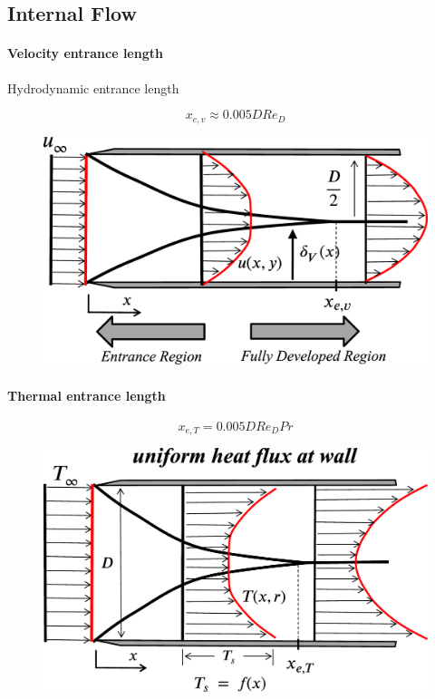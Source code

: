 \documentclass[12pt, a4paper]{article}
\numberwithin{equation}{subsection}
\begin{document}
\subsection{Internal Flow}
\paragraph{Velocity entrance length} Hydrodynamic entrance length

\[
    x_{e,v} \approx 0.005 D Re_{D}
\]
\begin{figure}[H]
    \centering
    \includegraphics[width=.6\textwidth]{img/velocity_entrance_length.eps}
\end{figure}

\paragraph{Thermal entrance length}
\[
    x_{e,T} = 0.005 D Re_{D} Pr
\]
\begin{figure}[H]
    \centering
    \includegraphics[width=.6\textwidth]{img/thermal_entrance_length.eps}
\end{figure}
\end{document}
